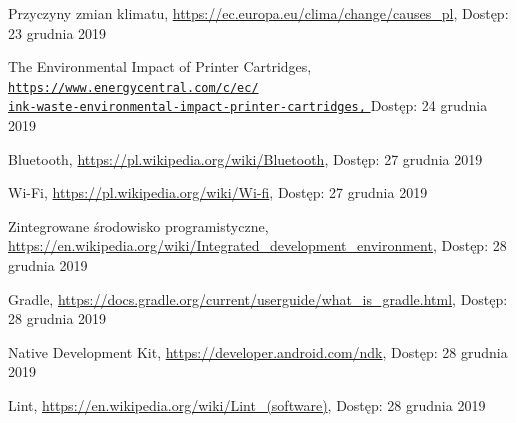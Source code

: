 \documentclass[a4paper,12pt, twoside]{article}
\begin{document}
 	\begingroup
	\renewcommand{\section}[2]{}%
	\begin{thebibliography}{}
		
		Przyczyny zmian klimatu,
		\newline\url{https://ec.europa.eu/clima/change/causes\_pl}, 
		\newline Dostęp: 23 grudnia 2019
		
		The Environmental Impact of Printer Cartridges,
		\newline\href{https://www.energycentral.com/c/ec/ink-waste-environmental-impact-printer-cartridges}
		 {\nolinkurl{https://www.energycentral.com/c/ec/}
             \\
              \nolinkurl{ink-waste-environmental-impact-printer-cartridges,}
             }
		\newline Dostęp: 24 grudnia 2019
		
		Bluetooth,
		\newline\url{https://pl.wikipedia.org/wiki/Bluetooth}, 
		\newline Dostęp: 27 grudnia 2019
			
		Wi-Fi,
		\newline\url{https://pl.wikipedia.org/wiki/Wi-fi}, 
		\newline Dostęp: 27 grudnia 2019
		
		Zintegrowane środowisko programistyczne,
		\newline\url{https://en.wikipedia.org/wiki/Integrated_development_environment}, 
		\newline Dostęp: 28 grudnia 2019
		
		Gradle,
		\newline\url{https://docs.gradle.org/current/userguide/what_is_gradle.html}, 
		\newline Dostęp: 28 grudnia 2019
		
		Native Development Kit,
		\newline\url{https://developer.android.com/ndk}, 
		\newline Dostęp: 28 grudnia 2019
		
		Lint,
		\newline\url{https://en.wikipedia.org/wiki/Lint_(software)}, 
		\newline Dostęp: 28 grudnia 2019
		

\end{thebibliography}
\end{document}
